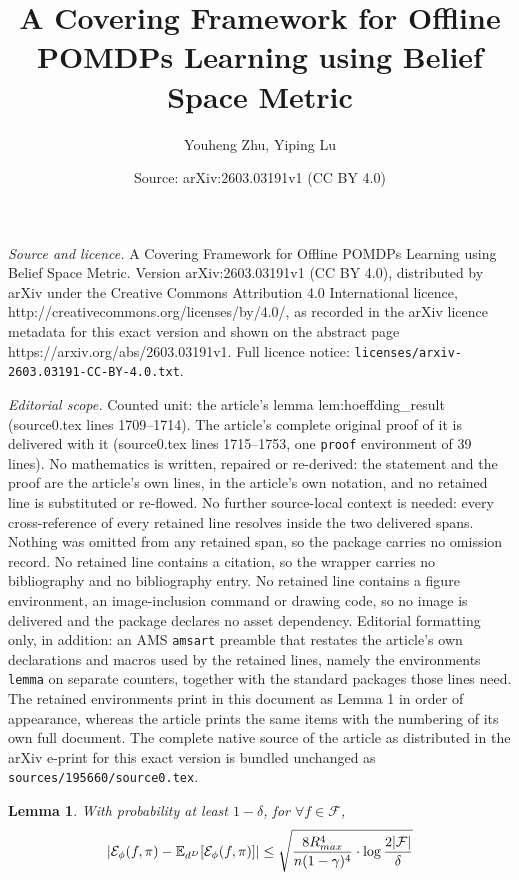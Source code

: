 \documentclass[10pt,a4paper]{amsart}
\title{A Covering Framework for Offline POMDPs Learning using Belief Space Metric}
\author{Youheng Zhu, Yiping Lu}
\date{Source: arXiv:2603.03191v1 (CC BY 4.0)}
\newtheorem{lemma}{Lemma}
\begin{document}
\maketitle

\noindent\emph{Source and licence.} A Covering Framework for Offline POMDPs Learning using Belief Space Metric. Version arXiv:2603.03191v1 (CC BY 4.0), distributed by arXiv under the Creative Commons Attribution 4.0 International licence, http://creativecommons.org/licenses/by/4.0/, as recorded in the arXiv licence metadata for this exact version and shown on the abstract page https://arxiv.org/abs/2603.03191v1. Full licence notice: \texttt{licenses/arxiv-2603.03191-CC-BY-4.0.txt}.\par\smallskip

\noindent\textit{Editorial scope.} Counted unit: the article's lemma lem:hoeffding\_result (source0.tex lines 1709--1714). The article's complete original proof of it is delivered with it (source0.tex lines 1715--1753, one \texttt{proof} environment of 39 lines). No mathematics is written, repaired or re-derived: the statement and the proof are the article's own lines, in the article's own notation, and no retained line is substituted or re-flowed.  No further source-local context is needed: every cross-reference of every retained line resolves inside the two delivered spans.  Nothing was omitted from any retained span, so the package carries no omission record.  No retained line contains a citation, so the wrapper carries no bibliography and no bibliography entry.  No retained line contains a figure environment, an image-inclusion command or drawing code, so no image is delivered and the package declares no asset dependency.  Editorial formatting only, in addition: an AMS \texttt{amsart} preamble that restates the article's own declarations and macros used by the retained lines, namely the environments \texttt{lemma} on separate counters, together with the standard packages those lines need.  The retained environments print in this document as Lemma 1 in order of appearance, whereas the article prints the same items with the numbering of its own full document.  The complete native source of the article as distributed in the arXiv e-print for this exact version is bundled unchanged as \texttt{sources/195660/source0.tex}.
\begin{lemma}\label{lem:hoeffding_result}
    With probability at least $1-\delta$, for $\forall f\in\mathcal{F}$,
    \begin{align}
        |\mathcal{E}_\phi(f,\pi)-\mathbb{E}_{d^{D}}[\mathcal{E}_\phi(f,\pi)]|\leq\sqrt{\frac{8R_{\rm max}^4}{n(1-\gamma)^4}\cdot\log\frac{2|\mathcal{F}|}{\delta}}
    \end{align}
\end{lemma}
\end{document}
